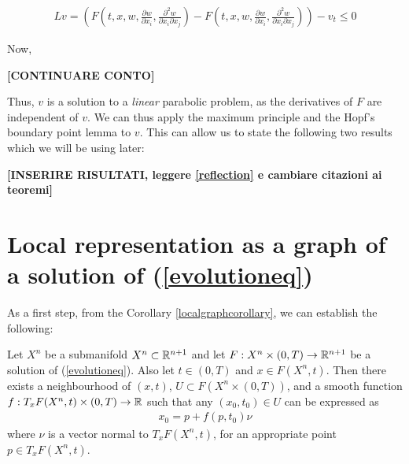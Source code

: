 \begin{align*}
	Lv= \left( F\left(t, x, w, \frac{\partial w}{\partial x_i} , \frac{\partial^2 w}{\partial x_i \partial x_j}\right) - F\left(t, x, w, \frac{\partial w}{\partial x_i} , \frac{\partial^2 w}{\partial x_i \partial x_j}\right)\right)-v_t \leq 0
\end{align*}

Now, 

{\vspace{10pt}\LARGE \bf [CONTINUARE CONTO]}

Thus, $v$ is a solution to a \textit{linear} parabolic problem, as the derivatives of $F$ are independent of $v$. We can thus apply the maximum principle and the Hopf's boundary point lemma to $v$. This can allow us to state the following two results which we will be using later:

{\vspace{10pt}\LARGE \bf [INSERIRE RISULTATI, leggere \ref{reflection} e cambiare citazioni ai teoremi]}


\section{Local representation as a graph of a solution of (\ref{evolutioneq})}
As a first step, from the Corollary \ref{localgraphcorollary}, we can establish the following:

\begin{theorem}
	Let $X^n$ be a submanifold $X^n\subset\mathbb{R}^{n+1}$ and let $F:X^n\times(0, T)\rightarrow \mathbb{R}^{n+1}$ be a solution of (\ref{evolutioneq}). Also let $t\in(0, T)$ and $x\in F(X^n, t)$.
	Then there exists a neighbourhood of $(x, t)$, $U\subset F(X^n\times(0, T))$, and a smooth function $f: T_{x} F(X^n, t)\times(0, T)\rightarrow \mathbb{R}$ such that any $(x_0, t_0)\in U$ can be expressed as 
	\begin{align*}
		x_0= p +f(p, t_0) \nu 
	\end{align*}
	where $\nu$ is a vector normal to $T_{x} F(X^n, t)$, for an appropriate point $p\in T_x F(X^n, t)$. \label{localgraph}
\end{theorem}
\begin{comment}
	{\vspace{10pt}\LARGE \bf [NON FUNZIONA! Difficile (impossibile?)dimostrare che è smooth]}
	With a reasoning similar to \ref{localgraphclassic} and \ref{localgraphcorollary} one can prove that given any plane, we can represent locally a manifold $M\subset\R^{n+1}$ at $x\in M$ as a graph on that plane, i.e. as $x_0= p + f(p) \nu$ for $\nu$ the vector orthogonal to the plane, as long as $\nu\notin T_xM$. 
	The function which associates to $t\in [0,T)$ the unit vector orthogonal to $T_{F(x, t)}F(X, t)$ is continuous, as $F$ is smooth and the vector can be computed from the derivatives of the local maps of the manifold. Thus we can find a neighbourhood $(a,b)$ of $ t_0$ such that for $t \in (a,b)$ the normal vector is not in $T_x F(X^n, t)$. In $(a,b)$ we can represent $F(X)
\end{comment}


